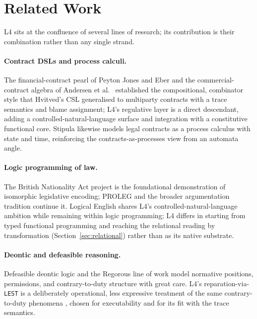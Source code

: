 \documentclass[sigconf,nonacm]{acmart}
\newcommand{\code}[1]{\texttt{\small #1}}
\begin{document}
\section{Related Work}\label{sec:related}
L4 sits at the confluence of several lines of research; its contribution is
their combination rather than any single strand.

\paragraph{Contract DSLs and process calculi.}
The financial-contract pearl of Peyton Jones and Eber
\cite{pjeber2000composing} and the commercial-contract algebra of Andersen
et al.\ \cite{andersen2006compositional} established the compositional,
combinator style that Hvitved's CSL \cite{hvitved2011thesis,hvitved2012trace}
generalised to multiparty contracts with a trace semantics and blame
assignment; L4's regulative layer is a direct descendant, adding a
controlled-natural-language surface and integration with a constitutive
functional core. Stipula \cite{crafa2022stipula} likewise models legal
contracts as a process calculus with state and time, reinforcing the
contracts-as-processes view from an automata angle.

\paragraph{Logic programming of law.}
The British Nationality Act project \cite{sergot1986bna} is the foundational
demonstration of isomorphic legislative encoding; PROLEG
\cite{satoh2011proleg} and the broader argumentation tradition
\cite{prakken2015law,bench2012history} continue it. Logical English
\cite{kowalski2021logicalenglish} shares L4's controlled-natural-language
ambition while remaining within logic programming; L4 differs in starting
from typed functional programming and reaching the relational reading by
transformation (Section~\ref{sec:relational}) rather than as its native
substrate.

\paragraph{Deontic and defeasible reasoning.}
Defeasible deontic logic and the Regorous line of work
\cite{governatori2005regorous,governatori2016semantics} model normative
positions, permissions, and contrary-to-duty structure with great
care. L4's reparation-via-\code{LEST} is a deliberately operational, less
expressive treatment of the same contrary-to-duty phenomena
\cite{chisholm1963ctd}, chosen for executability and for its fit with the
trace semantics.
\end{document}
